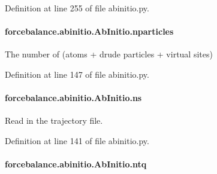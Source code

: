 Definition at line 255 of file abinitio.\-py.

\hypertarget{classforcebalance_1_1abinitio_1_1AbInitio_aef3798e4666b91ecc4c526b679eb4908}{
\paragraph[{nparticles}]{\setlength{\rightskip}{0pt plus 5cm}forcebalance.\-abinitio.\-Ab\-Initio.\-nparticles\hspace{0.3cm}{\ttfamily [inherited]}}}\label{classforcebalance_1_1abinitio_1_1AbInitio_aef3798e4666b91ecc4c526b679eb4908}


The number of (atoms + drude particles + virtual sites) 



Definition at line 147 of file abinitio.\-py.

\hypertarget{classforcebalance_1_1abinitio_1_1AbInitio_a1e8248e2efe952362b1b21462a70b540}{
\paragraph[{ns}]{\setlength{\rightskip}{0pt plus 5cm}forcebalance.\-abinitio.\-Ab\-Initio.\-ns\hspace{0.3cm}{\ttfamily [inherited]}}}\label{classforcebalance_1_1abinitio_1_1AbInitio_a1e8248e2efe952362b1b21462a70b540}


Read in the trajectory file. 



Definition at line 141 of file abinitio.\-py.

\hypertarget{classforcebalance_1_1abinitio_1_1AbInitio_af8a895f61ddea6b9ca2765ddbf309a75}{
\paragraph[{ntq}]{\setlength{\rightskip}{0pt plus 5cm}forcebalance.\-abinitio.\-Ab\-Initio.\-ntq\hspace{0.3cm}{\ttfamily [inherited]}}}\label{classforcebalance_1_1abinitio_1_1AbInitio_af8a895f61ddea6b9ca2765ddbf309a75}


